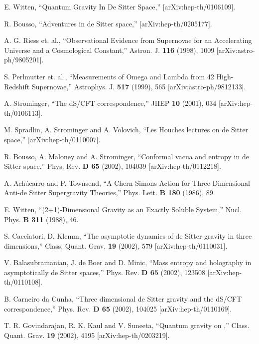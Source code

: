 \documentclass[a4paper,11pt]{article}
\begin{document}
\begin{thebibliography}{99}

E. Witten,
``Quantum Gravity In De Sitter Space,''
[arXiv:hep-th/0106109].

R. Bousso,
``Adventures in de Sitter space,'' 
[arXiv:hep-th/0205177].

A. G. Riess et. al.,
``Observational Evidence from Supernovae for an Accelerating Universe
and a Cosmological Constant,''
Astron. J. {\bf 116} (1998), 1009 [arXiv:astro-ph/9805201].

S. Perlmutter et. al.,
``Measurements of Omega and Lambda from 42 High-Redshift Supernovae,''
Astrophys. J. {\bf 517} (1999), 565 [arXiv:astro-ph/9812133].  

A. Strominger,
``The dS/CFT correspondence,''
JHEP {\bf 10} (2001), 034 [arXiv:hep-th/0106113].

M. Spradlin, A. Strominger and A. Volovich,
``Les Houches lectures on de Sitter space,''
[arXiv:hep-th/0110007].

R. Bousso, A. Maloney and A. Strominger,
``Conformal vacua and entropy in de Sitter space,''
Phys. Rev. {\bf D 65} (2002), 104039 [arXiv:hep-th/0112218].

A. Ach\'ucarro and P. Townsend,
``A Chern-Simons Action for Three-Dimensional Anti-de Sitter
Supergravity Theories,''
Phys. Lett. {\bf B 180} (1986), 89.

E. Witten,
``(2+1)-Dimensional Gravity as an Exactly Soluble System,''
Nucl. Phys. {\bf B 311} (1988), 46.

S. Cacciatori, D. Klemm, 
``The asymptotic dynamics of de Sitter gravity in three dimensions,''
Class. Quant. Grav.  {\bf 19} (2002), 579 [arXiv:hep-th/0110031].

V. Balasubramanian, J. de Boer and D. Minic,
``Mass entropy and holography in asymptotically de Sitter spaces,''
Phys. Rev. {\bf D 65} (2002), 123508 [arXiv:hep-th/0110108].

B. Carneiro da Cunha,
``Three dimensional de Sitter gravity and the dS/CFT correspondence,''
Phys. Rev. {\bf D 65} (2002), 104025 [arXiv:hep-th/0110169].

T. R. Govindarajan, R. K. Kaul and V. Suneeta,
``Quantum gravity on \coordHE{},''
Class. Quant. Grav. {\bf 19} (2002), 4195 [arXiv:hep-th/0203219]. 


\end{thebibliography}
\end{document}
